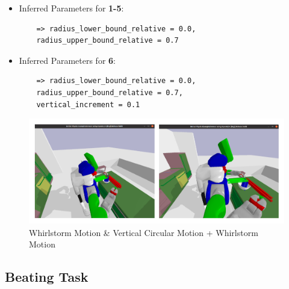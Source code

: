\begin{itemize}
  \item Inferred Parameters for \textbf{1-5}: 
   \begin{lstlisting}
    => radius_lower_bound_relative = 0.0, 
    radius_upper_bound_relative = 0.7
  \end{lstlisting}
  \item Inferred Parameters for \textbf{6}:
  \begin{lstlisting}
    => radius_lower_bound_relative = 0.0, 
    radius_upper_bound_relative = 0.7,
    vertical_increment = 0.1
  \end{lstlisting}
\end{itemize}

\begin{figure}[H]
  \includegraphics[scale=0.26]{Graphics/mixingtask_rahmen.jpg}
  \caption{Whirlstorm Motion \& Vertical Circular Motion + Whirlstorm Motion}
  \label{fig:mixingverb WikiHow}
\end{figure}

\subsection{Beating Task}

